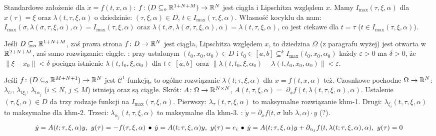 Standardowe  założenie dla $\dot x = f(t, x, \alpha)$: $f \colon (D \subseteq_o \mathbb{R}^{1+N+M}) \to \mathbb{R}^N$ jest ciągła i Lipschitza względem $x$.
Mamy  $I_{\max}(\tau, \xi, \alpha)$ dla $x(\tau) = \xi$ oraz  $\lambda(t, \tau, \xi, \alpha)$ o dziedzinie: $(\tau, \xi, \alpha) \in D$, $t \in I_{\max} (\tau, \xi, \alpha)$.
Własność kocyklu da nam: $I_{\max}(\sigma, \lambda(\sigma, \tau, \xi, \alpha), \alpha) = I_{\max}(\tau, \xi, \alpha)$ oraz $\lambda(t, \sigma, \lambda(\sigma, \tau, \xi, \alpha), \alpha) = \lambda(t, \tau, \xi, \alpha)$, co jest ciekawe dla $t = \tau$ ($t \in I_{\max}(\tau, \xi, \alpha)$).

Jeśli  $D \subseteq_o \mathbb{R}^{1+N+M}$, zaś prawa strona $f \colon D \to \mathbb{R}^N$ jest ciągła, Lipschitza względem $x$, to dziedzina $\Omega$ (z paragrafu wyżej) jest otwarta w $\mathbb{R}^{2 + N + M}$, zaś samo rozwiązanie: ciągłe.
: przy ustalonym $(t_0, x_0, \alpha_0)\in D$ i $t_0 \in [a,b] \subseteq^k I_{\max}(t_0, x_0, \alpha_0)$ każdy $\varepsilon > 0$ ma $\delta > 0$, że $\|\xi - x_0\| < \delta$ pociąga istnienie $\lambda(t, t_0, \xi, \alpha_0)$ dla $t \in [a,b]$ oraz $\|\lambda(t, t_0, \xi, \alpha_0) - \lambda(t, t_0, x_0, \alpha_0)\| < \varepsilon$.

Jeśli  $f \colon (D \subseteq_o \mathbb{R}^{M+N+1}) \to \mathbb{R}^N$ jest $\mathscr C^1$-funkcją, to ogólne rozwiązanie $\lambda(t; \tau, \xi, \alpha)$ dla $\dot x = f(t,x,\alpha)$ też.
Czosnkowe pochodne $\Omega \to \mathbb{R}^N$: $\lambda_{t\tau}$, $\lambda_{t\xi_i}$, $\lambda_{t\alpha_j}$ ($i \le N$, $j \le M$) istnieją oraz są ciągłe.
Skrót: $A \colon \Omega \to \mathbb{R}^{N \times N}$, $A(t, \tau, \xi, \alpha) =$ $\partial_xf(t, \lambda(t, \tau, \xi, \alpha), \alpha)$.
Ustalenie $(\tau, \xi, \alpha) \in D$ da trzy rodzaje funkcji na $I_{\max}(\tau, \xi, \alpha)$.
Pierwszy: $\lambda_\tau (t, \tau, \xi, \alpha)$ to maksymalne rozwiązanie khm-1.
Drugi: $\lambda_{\xi_i} (t, \tau, \xi, \alpha)$ to maksymalne dla khm-2. 
Trzeci: $\lambda_{\alpha_j} (t, \tau, \xi, \alpha)$ to maksymalne dla khm-3. 
: $\dot y = \partial_x f(t, \sigma$ lub $\lambda, \alpha) \cdot y$ (?).
\[
	\dot y = A(t; \tau, \xi, \alpha) y, \,\, y(\tau) = - f(\tau, \xi, \alpha) \, \bullet \,
	\dot y = A(t; \tau, \xi, \alpha) y, \,\, y(\tau) = e_i \, \bullet \,
	\dot y = A(t; \tau, \xi, \alpha) y + \partial_{\alpha_j} f(t, \lambda(t; \tau, \xi, \alpha),\alpha), \,\, y(\tau) = 0
\]

